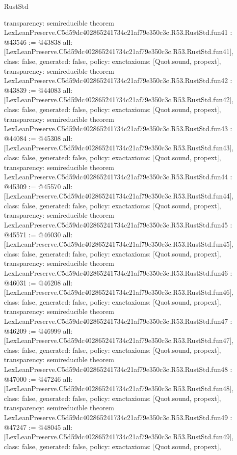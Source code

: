 \begin{lexlean}{RustStd}
\begin{coremodule}
{  transparency: semireducible
}
theorem LexLeanPreserve.C5d59dc402865241734c21af79e350c3c.R53.RustStd.fun41 : @43546 := @43838 {
  all: [LexLeanPreserve.C5d59dc402865241734c21af79e350c3c.R53.RustStd.fun41],
  class: false,
  generated: false,
  policy: exact{axioms: [Quot.sound, propext]},
  transparency: semireducible
}
theorem LexLeanPreserve.C5d59dc402865241734c21af79e350c3c.R53.RustStd.fun42 : @43839 := @44083 {
  all: [LexLeanPreserve.C5d59dc402865241734c21af79e350c3c.R53.RustStd.fun42],
  class: false,
  generated: false,
  policy: exact{axioms: [Quot.sound, propext]},
  transparency: semireducible
}
theorem LexLeanPreserve.C5d59dc402865241734c21af79e350c3c.R53.RustStd.fun43 : @44084 := @45308 {
  all: [LexLeanPreserve.C5d59dc402865241734c21af79e350c3c.R53.RustStd.fun43],
  class: false,
  generated: false,
  policy: exact{axioms: [Quot.sound, propext]},
  transparency: semireducible
}
theorem LexLeanPreserve.C5d59dc402865241734c21af79e350c3c.R53.RustStd.fun44 : @45309 := @45570 {
  all: [LexLeanPreserve.C5d59dc402865241734c21af79e350c3c.R53.RustStd.fun44],
  class: false,
  generated: false,
  policy: exact{axioms: [Quot.sound, propext]},
  transparency: semireducible
}
theorem LexLeanPreserve.C5d59dc402865241734c21af79e350c3c.R53.RustStd.fun45 : @45571 := @46030 {
  all: [LexLeanPreserve.C5d59dc402865241734c21af79e350c3c.R53.RustStd.fun45],
  class: false,
  generated: false,
  policy: exact{axioms: [Quot.sound, propext]},
  transparency: semireducible
}
theorem LexLeanPreserve.C5d59dc402865241734c21af79e350c3c.R53.RustStd.fun46 : @46031 := @46208 {
  all: [LexLeanPreserve.C5d59dc402865241734c21af79e350c3c.R53.RustStd.fun46],
  class: false,
  generated: false,
  policy: exact{axioms: [Quot.sound, propext]},
  transparency: semireducible
}
theorem LexLeanPreserve.C5d59dc402865241734c21af79e350c3c.R53.RustStd.fun47 : @46209 := @46999 {
  all: [LexLeanPreserve.C5d59dc402865241734c21af79e350c3c.R53.RustStd.fun47],
  class: false,
  generated: false,
  policy: exact{axioms: [Quot.sound, propext]},
  transparency: semireducible
}
theorem LexLeanPreserve.C5d59dc402865241734c21af79e350c3c.R53.RustStd.fun48 : @47000 := @47246 {
  all: [LexLeanPreserve.C5d59dc402865241734c21af79e350c3c.R53.RustStd.fun48],
  class: false,
  generated: false,
  policy: exact{axioms: [Quot.sound, propext]},
  transparency: semireducible
}
theorem LexLeanPreserve.C5d59dc402865241734c21af79e350c3c.R53.RustStd.fun49 : @47247 := @48045 {
  all: [LexLeanPreserve.C5d59dc402865241734c21af79e350c3c.R53.RustStd.fun49],
  class: false,
  generated: false,
  policy: exact{axioms: [Quot.sound, propext]},
}
\end{coremodule}
\end{lexlean}
